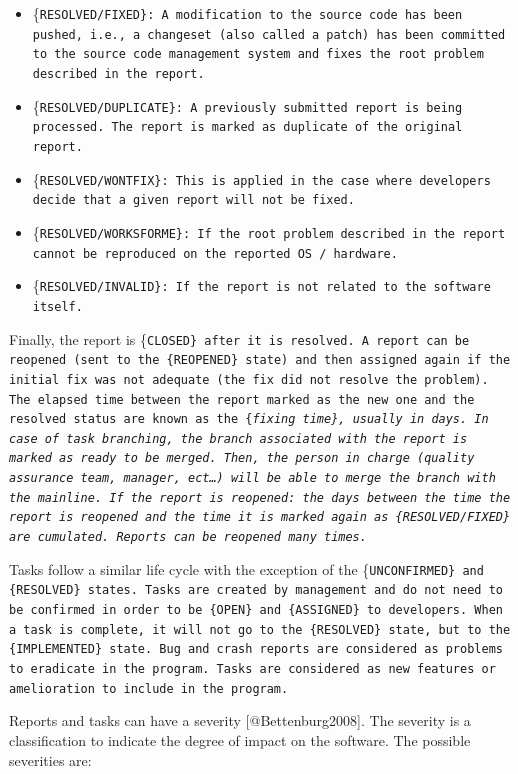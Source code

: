 \begin{itemize}
\tightlist
\item
  \{\tt RESOLVED/FIXED\}: A modification to the source code has been
  pushed, i.e., a changeset (also called a patch) has been committed to
  the source code management system and fixes the root problem described
  in the report.
\item
  \{\tt RESOLVED/DUPLICATE\}: A previously submitted report is being
  processed. The report is marked as duplicate of the original report.
\item
  \{\tt RESOLVED/WONTFIX\}: This is applied in the case where developers
  decide that a given report will not be fixed.
\item
  \{\tt RESOLVED/WORKSFORME\}: If the root problem described in the
  report cannot be reproduced on the reported OS / hardware.
\item
  \{\tt RESOLVED/INVALID\}: If the report is not related to the software
  itself.
\end{itemize}

Finally, the report is \{\tt CLOSED\} after it is resolved. A report can
be reopened (sent to the \{\tt REOPENED\} state) and then assigned again
if the initial fix was not adequate (the fix did not resolve the
problem). The elapsed time between the report marked as the new one and
the resolved status are known as the \{\it fixing time\}, usually in
days. In case of task branching, the branch associated with the report
is marked as ready to be merged. Then, the person in charge (quality
assurance team, manager, ect\ldots{}) will be able to merge the branch
with the mainline. If the report is reopened: the days between the time
the report is reopened and the time it is marked again as
\{\tt RESOLVED/FIXED\} are cumulated. Reports can be reopened many
times.

Tasks follow a similar life cycle with the exception of the
\{\tt UNCONFIRMED\} and \{\tt RESOLVED\} states. Tasks are created by
management and do not need to be confirmed in order to be \{\tt OPEN\}
and \{\tt ASSIGNED\} to developers. When a task is complete, it will not
go to the \{\tt RESOLVED\} state, but to the \{\tt IMPLEMENTED\} state.
Bug and crash reports are considered as problems to eradicate in the
program. Tasks are considered as new features or amelioration to include
in the program.

Reports and tasks can have a severity {[}@Bettenburg2008{]}. The
severity is a classification to indicate the degree of impact on the
software. The possible severities are:

